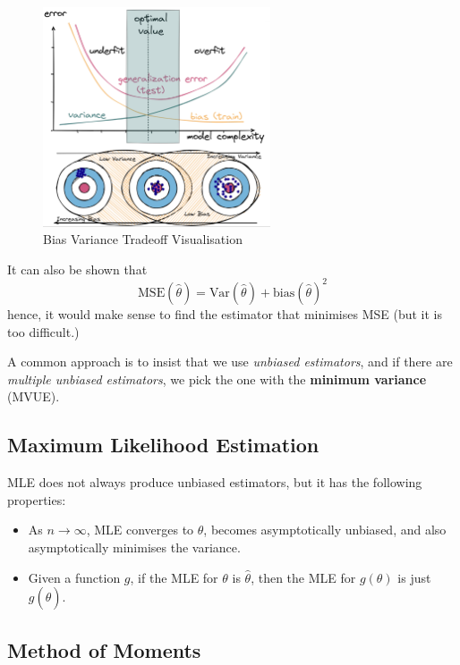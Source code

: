 \documentclass{article}
\begin{document}
\begin{figure}[H]
    \centering
    \includegraphics[width=0.6\textwidth]{Images/biasvariancetradeoff.png}
    \caption{Bias Variance Tradeoff Visualisation}
    \label{fig:13-biasvariancetradeoff}
\end{figure} 

\noindent It can also be shown that \begin{equation*}
    \text{MSE}(\hat{\theta}) = \text{Var}(\hat{\theta}) + \text{bias}(\hat{\theta})^{2}
\end{equation*} hence, it would make sense to find the estimator that minimises MSE (but it is too difficult.) 

\noindent A common approach is to insist that we use \textit{unbiased estimators}, and if there are \textit{multiple unbiased estimators}, we pick the one with the \textbf{minimum variance} (MVUE). 

\subsection{Maximum Likelihood Estimation}

MLE does not always produce unbiased estimators, but it has the following properties: \begin{itemize}
    \item As $n \to \infty$, MLE converges to $\theta$, becomes asymptotically unbiased, and also asymptotically minimises the variance. 
    \item Given a function $g$, if the MLE for $\theta$ is $\hat{\theta}$, then the MLE for $g(\theta)$ is just $g(\hat{\theta})$. 
\end{itemize}


\subsection{Method of Moments}
\end{document}
